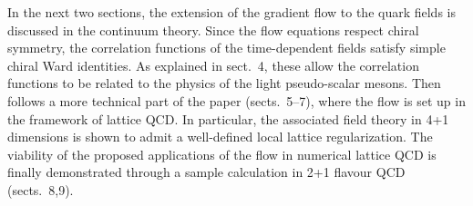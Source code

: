 In the next two sections, the extension of the gradient
flow to the quark fields is discussed in the continuum theory.
Since the flow equations respect chiral symmetry,
the correlation functions of the time-dependent fields
satisfy simple chiral Ward identities.
As explained in sect.~4, these allow
the correlation functions to be related to the 
physics of the light pseudo-scalar mesons.
Then follows a more technical part of the paper
(sects.~5--7), where the flow is set up in the framework of 
lattice QCD. In particular, the associated field theory
in 4+1 dimensions is shown to admit a well-defined
local lattice regularization. 
The viability of the proposed applications of the 
flow in numerical lattice QCD is finally demonstrated 
through a sample calculation in 2+1 flavour QCD (sects.~8,9).


